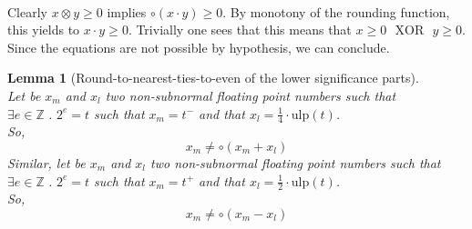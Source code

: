 \documentclass[a4paper,10pt,twoside]{article}
\newtheorem{lemma}[theorem]{Lemma}
\newenvironment{proof}[1][Proof]{\begin{trivlist}
\item[\hskip \labelsep {\bfseries #1}]}{\end{trivlist}}
\newcommand{\qed}{\nobreak \ifvmode \relax \else \ifdim \lastskip<1.5em \hskip-\lastskip
\hskip1.5em plus0em minus0.5em \fi \nobreak \vrule height0.75em width0.5em depth0.25em\fi}
\newcommand{\Z}{\ensuremath{\mathbb {Z}}}
\newcommand{\mi}{\ensuremath{\mathit{m}}}
\newcommand{\lo}{\ensuremath{\mathit{l}}}
\newcommand{\mUlp}{\ensuremath{\mathrm{ulp}}}
\newcommand{\xor}{\ensuremath{\mbox{ }\mathrm{XOR}\mbox{ }}}
\begin{document}
\begin{proof} ~ \\
Clearly $x \otimes y \geq 0$ implies $\circ \left( x \cdot y \right) \geq 0$. By monotony of the rounding function, this yields to
$x \cdot y \geq 0$. Trivially one sees that this means that $x \geq 0 \xor y \geq 0$. Since the equations are not possible
by hypothesis, we can conclude.\qed
\end{proof}
\begin{lemma}[Round-to-nearest-ties-to-even of the lower significance parts] \label{arrpairfaible} ~ \\
Let be $x_\mi$ and $x_\lo$ two non-subnormal floating point numbers such that
$\exists e \in \Z \mbox{ . } 2^e = t$ such that $x_\mi = t^-$
and that $x_\lo = \frac{1}{4} \cdot \mUlp\left( t \right)$. \\
So,
$$x_\mi \not = \circ \left( x_\mi + x_\lo \right)$$
Similar, let be $x_\mi$ and $x_\lo$ two non-subnormal floating point numbers such that
$\exists e \in \Z \mbox{ . } 2^e = t$ such that $x_\mi = t^+$
and that $x_\lo = \frac{1}{2} \cdot \mUlp\left( t \right)$. \\
So,
$$x_\mi \not = \circ \left( x_\mi - x_\lo \right)$$
\end{lemma}
\end{document}
